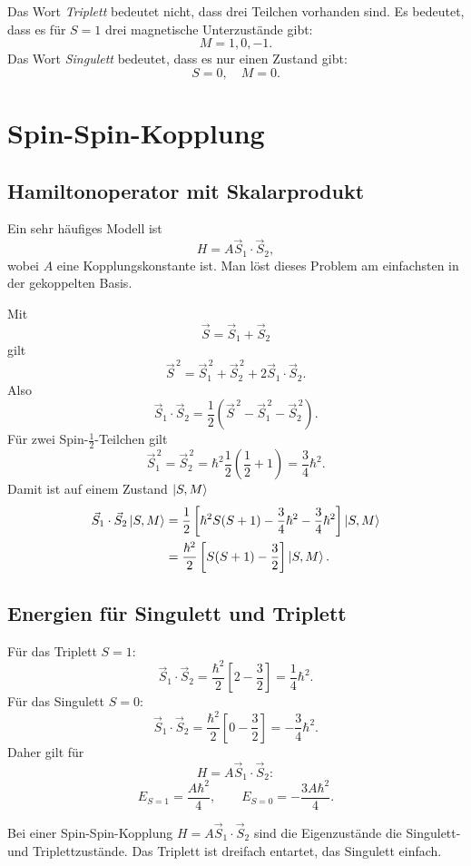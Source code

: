 \begin{notebox}
Das Wort \emph{Triplett} bedeutet nicht, dass drei Teilchen vorhanden sind. Es bedeutet, dass es für \(S=1\) drei magnetische Unterzustände gibt:
\[
    M=1,0,-1.
\]
Das Wort \emph{Singulett} bedeutet, dass es nur einen Zustand gibt:
\[
    S=0,
    \quad M=0.
\]
\end{notebox}

\section{Spin-Spin-Kopplung}

\subsection{Hamiltonoperator mit Skalarprodukt}

Ein sehr häufiges Modell ist
\[
    H=A\vec S_1\cdot\vec S_2,
\]
wobei \(A\) eine Kopplungskonstante ist. Man löst dieses Problem am einfachsten in der gekoppelten Basis.

Mit
\[
    \vec S=\vec S_1+\vec S_2
\]
gilt
\[
    \vec S^{\,2}=\vec S_1^{\,2}+\vec S_2^{\,2}+2\vec S_1\cdot\vec S_2.
\]
Also
\[
    \vec S_1\cdot\vec S_2
    =\frac12\left(\vec S^{\,2}-\vec S_1^{\,2}-\vec S_2^{\,2}\right).
\]
Für zwei Spin-\(\frac12\)-Teilchen gilt
\[
    \vec S_1^{\,2}=\vec S_2^{\,2}=\hbar^2\frac12\left(\frac12+1\right)=\frac34\hbar^2.
\]
Damit ist auf einem Zustand \(\left|S,M\right\rangle\)
\begin{align*}
    \vec S_1\cdot\vec S_2\left|S,M\right\rangle
    &=\frac12\left[\hbar^2S(S+1)-\frac34\hbar^2-\frac34\hbar^2\right]\left|S,M\right\rangle\\
    &=\frac{\hbar^2}{2}\left[S(S+1)-\frac32\right]\left|S,M\right\rangle.
\end{align*}

\subsection{Energien für Singulett und Triplett}

Für das Triplett \(S=1\):
\[
    \vec S_1\cdot\vec S_2
    =\frac{\hbar^2}{2}\left[2-\frac32\right]
    =\frac14\hbar^2.
\]
Für das Singulett \(S=0\):
\[
    \vec S_1\cdot\vec S_2
    =\frac{\hbar^2}{2}\left[0-\frac32\right]
    =-\frac34\hbar^2.
\]
Daher gilt für
\[
    H=A\vec S_1\cdot\vec S_2:
\]
\[
    E_{S=1}=\frac{A\hbar^2}{4},
    \qquad
    E_{S=0}=-\frac{3A\hbar^2}{4}.
\]

\begin{answerbox}
Bei einer Spin-Spin-Kopplung \(H=A\vec S_1\cdot\vec S_2\) sind die Eigenzustände die Singulett- und Triplettzustände. Das Triplett ist dreifach entartet, das Singulett einfach.
\end{answerbox}

